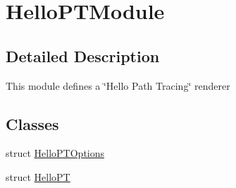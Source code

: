 \hypertarget{group___hello_p_t_module}{}\section{Hello\+P\+T\+Module}
\label{group___hello_p_t_module}


\subsection{Detailed Description}
This module defines a \char`\"{}\+Hello Path Tracing\char`\"{} renderer \subsection*{Classes}
\begin{DoxyCompactItemize}
\item 
struct \hyperlink{struct_hello_p_t_options}{Hello\+P\+T\+Options}
\item 
struct \hyperlink{struct_hello_p_t}{Hello\+PT}
\end{DoxyCompactItemize}

